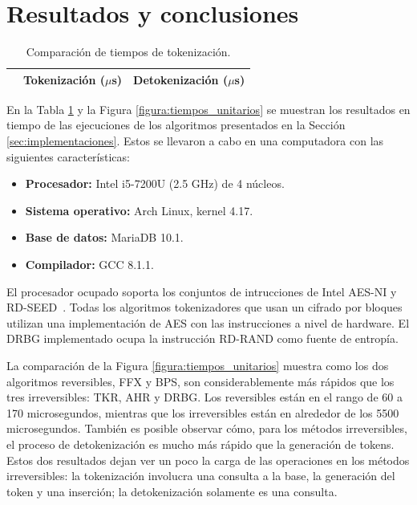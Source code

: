 %
%
%

\section{Resultados y conclusiones}
\label{sec:conclusiones}

\begin{table}
  \renewcommand{\arraystretch}{1.3}
  \centering
  \caption{Comparación de tiempos de tokenización.}
  \label{tabla:tiempos_tokenizacion}
  \begin{tabular}{c c c}
    \hline
     & Tokenización ($\mu$s) & Detokenización ($\mu$s) \\
    \hline
    
    \hline
  \end{tabular}
\end{table}


En la Tabla \ref{tabla:tiempos_tokenizacion} y la Figura
\ref{figura:tiempos_unitarios} se muestran los resultados en tiempo de
las ejecuciones de los algoritmos presentados en la Sección
\ref{sec:implementaciones}. Estos se llevaron a cabo en una computadora con las
siguientes características:

\begin{itemize}
  \item \textbf{Procesador:} Intel i5-7200U (2.5 GHz) de 4 núcleos.
  \item \textbf{Sistema operativo:} Arch Linux, kernel 4.17.
  \item \textbf{Base de datos:} MariaDB 10.1.
  \item \textbf{Compilador:} GCC 8.1.1.
\end{itemize}

El procesador ocupado soporta los conjuntos de intrucciones de Intel AES-NI y
RD-SEED~\cite{aesni_wp}. Todas los algoritmos tokenizadores que usan un
cifrado por bloques utilizan una implementación de AES con las instrucciones a
nivel de hardware. El DRBG implementado ocupa la instrucción RD-RAND como fuente
de entropía.


La comparación de la Figura \ref{figura:tiempos_unitarios} muestra como los dos
algoritmos reversibles, FFX y BPS, son considerablemente más rápidos que los
tres irreversibles: TKR, AHR y DRBG. Los reversibles están en el rango de 60 a
170 microsegundos, mientras que los irreversibles están en alrededor de los 5500
microsegundos. También es posible observar cómo, para los métodos irreversibles,
el proceso de detokenización es mucho más rápido que la generación de tokens.
Estos dos resultados dejan ver un poco la carga de las operaciones en los
métodos irreversibles: la tokenización involucra una consulta a la base, la
generación del token y una inserción; la detokenización solamente es una
consulta.

